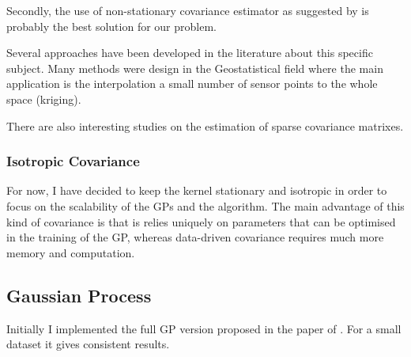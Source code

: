 Secondly, the use of non-stationary covariance estimator as suggested by \citet{krause_near-optimal_2008} is probably the best solution for our problem.

Several approaches have been developed in the literature about this specific subject. Many methods were design in the Geostatistical field where the main application is the interpolation a small number of sensor points to the whole space (kriging). 

There are also interesting studies on the estimation of sparse covariance matrixes. \\



%
%



\subsubsection{Isotropic Covariance}

For now, I have decided to keep the kernel stationary and isotropic  in order to focus on the scalability of the GPs and the algorithm. The main advantage of this kind of covariance is that is relies uniquely on parameters that can be optimised in the training of the GP, whereas data-driven covariance requires much more memory and computation. 

\subsection{Gaussian Process}

Initially I implemented the full GP version proposed in the paper of \cite{krause_near-optimal_2008}. For a small dataset it gives consistent results. \\

